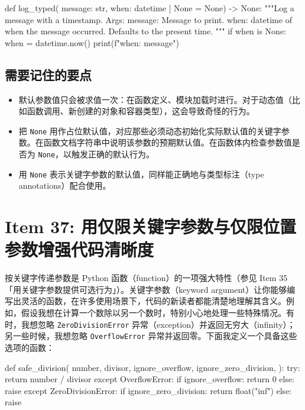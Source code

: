 \begin{codebox}[python]
def log_typed( message: str, when: datetime | None = None) ->
None:
    """Log a message with a timestamp.
    Args:
        message: Message to print.
        when: datetime of when the message occurred.
            Defaults to the present time.
    """
    if when is None:
        when = datetime.now()
    print(f"{when}: {message}")
\end{codebox}

\subsection{需要记住的要点}

\begin{itemize}
\item 默认参数值只会被求值一次：在函数定义、模块加载时进行。对于动态值（比如函数调用、新创建的对象和容器类型），这会导致奇怪的行为。
\item 把 \texttt{None} 用作占位默认值，对应那些必须动态初始化实际默认值的关键字参数。在函数文档字符串中说明该参数的预期默认值。在函数体内检查参数值是否为 \texttt{None}，以触发正确的默认行为。
\item 用 \texttt{None} 表示关键字参数的默认值，同样能正确地与类型标注（type annotations）配合使用。
\end{itemize}

\section{Item 37: 用仅限关键字参数与仅限位置参数增强代码清晰度}

按关键字传递参数是 Python 函数（function）的一项强大特性（参见 Item 35「用关键字参数提供可选行为」）。关键字参数（keyword argument）让你能够编写出灵活的函数，在许多使用场景下，代码的新读者都能清楚地理解其含义。例如，假设我想在计算一个数除以另一个数时，特别小心地处理一些特殊情况。有时，我想忽略 \texttt{ZeroDivisionError} 异常（exception）并返回无穷大（infinity）；另一些时候，我想忽略 \texttt{OverflowError} 异常并返回零。下面我定义一个具备这些选项的函数：

\begin{codebox}[python]
def safe_division(
    number,
    divisor,
    ignore_overflow,
    ignore_zero_division,
):
    try:
        return number / divisor
    except OverflowError:
        if ignore_overflow:
            return 0
        else:
            raise
    except ZeroDivisionError:
        if ignore_zero_division:
            return float("inf")
        else:
            raise
\end{codebox}

